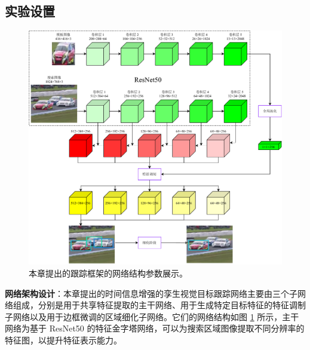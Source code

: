 \subsection{实验设置}

\begin{figure}[t]
    \centering
    \includegraphics[width=1.0\textwidth]{Img/end/FPN.pdf}
    \caption{本章提出的跟踪框架的网络结构参数展示。}
    \label{fig:end_FPN}
\end{figure}

\textbf{网络架构设计}：本章提出的时间信息增强的孪生视觉目标跟踪网络主要由三个子网络组成，分别是用于共享特征提取的主干网络、用于生成特定目标特征的特征调制子网络以及用于边框微调的区域细化子网络。它们的网络结构如图 \ref{fig:end_FPN} 所示，主干网络为基于 ResNet50 的特征金字塔网络，可以为搜索区域图像提取不同分辨率的特征图，以提升特征表示能力。

